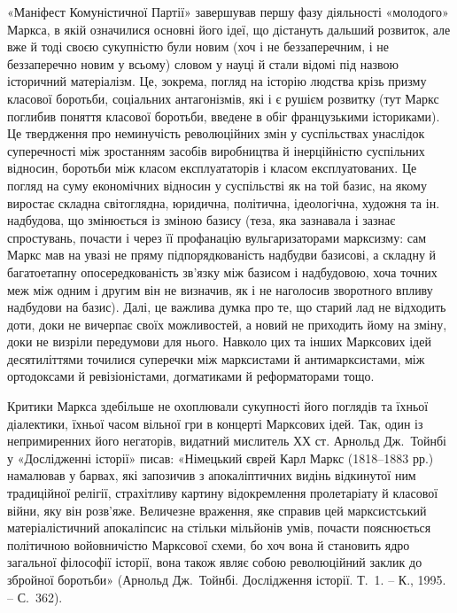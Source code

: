 «Маніфест Комуністичної Партії» завершував першу фазу діяльності 
«молодого» Маркса, в якій означилися основні його ідеї, що дістануть 
дальший розвиток, але вже й тоді своєю сукупністю були новим (хоч і не 
беззаперечним, і не беззаперечно новим у всьому) словом у науці й стали 
відомі під назвою історичний матеріалізм. Це, зокрема, погляд на 
історію людства крізь призму класової боротьби, соціальних 
антагонізмів, які і є рушієм розвитку (тут Маркс поглибив поняття 
класової боротьби, введене в обіг французькими істориками). Це 
твердження про неминучість революційних змін у суспільствах 
унаслідок суперечності між зростанням засобів виробництва й 
інерційністю суспільних відносин, боротьби між класом експлуататорів 
і класом експлуатованих. Це погляд на суму економічних відносин у 
суспільстві як на той базис, на якому виростає складна світоглядна, 
юридична, політична, ідеологічна, художня та ін. надбудова, що 
змінюється із зміною базису (теза, яка зазнавала і зазнає спростувань, 
почасти і через її профанацію вульгаризаторами марксизму: сам Маркс 
мав на увазі не пряму підпорядкованість надбудви базисові, а складну й 
багатоетапну опосередкованість зв'язку між базисом і надбудовою, хоча 
точних меж між одним і другим він не визначив, як і не наголосив 
зворотного впливу надбудови на базис). Далі, це важлива думка про те, що 
старий лад не відходить доти, доки не вичерпає своїх можливостей, а 
новий не приходить йому на зміну, доки не визріли передумови для нього. 
Навколо цих та інших Марксових ідей десятиліттями точилися суперечки 
між марксистами й антимарксистами, між ортодоксами й ревізіоністами, 
догматиками й реформаторами тощо.


Критики Маркса здебільше не охоплювали сукупності його поглядів та 
їхньої діалектики, їхньої часом вільної гри в концерті Марксових ідей. 
Так, один із непримиренних його негаторів, видатний мислитель ХХ ст. 
Арнольд Дж.~Тойнбі у «Дослідженні історії» писав: «Німецький єврей 
Карл Маркс (1818--1883 рр.) намалював у барвах, які запозичив з 
апокаліптичних видінь відкинутої ним традиційної релігії, 
страхітливу картину відокремлення пролетаріату й класової війни, яку 
він розв'яже. Величезне враження, яке справив цей марксистський 
матеріалістичний апокаліпсис на стільки мільйонів умів, почасти 
пояснюється політичною войовничістю Марксової схеми, бо хоч вона й 
становить ядро загальної філософії історії, вона також являє собою 
революційний заклик до збройної боротьби» (Арнольд Дж.~Тойнбі. 
Дослідження історії. Т.~1. -- К., 1995. -- С.~362). 


